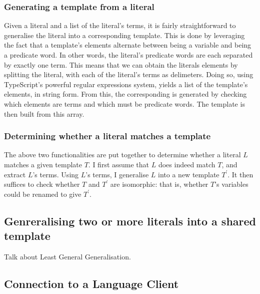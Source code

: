 \documentclass[../main.tex]{subfiles}
\begin{document}
\subsubsection{Generating a template from a literal}
Given a literal and a list of the literal's terms, it is fairly straightforward to generalise the literal into a corresponding template. This is done by leveraging the fact that a template's elements alternate between being a variable and being a predicate word. In other words, the literal's predicate words are each separated by exactly one term. This means that we can obtain the literals elements by splitting the literal, with each of the literal's terms as delimeters. Doing so, using TypeScript's powerful regular expressions system, yields a list of the template's elements, in string form. From this, the corresponding  is generated by checking which elements are terms and which must be predicate words. The template is then built from this array.


\subsubsection{Determining whether a literal matches a template}
The above two functionalities are put together to determine whether a literal $L$ matches a given template $T$. I first assume that $L$ does indeed match $T$, and extract $L$'s terms. Using $L$'s terms, I generalise $L$ into a new template $T^\prime$. It then suffices to check whether $T$ and $T^\prime$ are isomorphic: that is, whether $T$'s variables could be renamed to give $T^\prime$.

\subsection{Genreralising two or more literals into a shared template}
Talk about Least General Generalisation.

\subsection{Connection to a Language Client}
\end{document}
